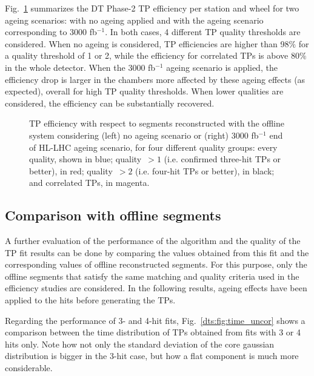 \documentclass[../main.tex]{subfiles}
\begin{document}
Fig.~\ref{dts:fig:efficiency} summarizes the DT Phase-2 TP efficiency per station and wheel for two ageing scenarios: with no ageing applied and with the ageing scenario corresponding to 3000 fb${}^{-1}$. In both cases, 4 different TP quality thresholds are considered. When no ageing is considered, TP efficiencies are higher than 98$\%$ for a quality threshold of 1 or 2, while the efficiency for correlated TPs is above 80$\%$ in the whole detector. When the 3000 fb${}^{-1}$ ageing scenario is applied, the efficiency drop is larger in the chambers more affected by these ageing effects (as expected), overall for high TP quality thresholds. When lower qualities are considered, the efficiency can be substantially recovered.


\begin{figure}[h!]

\begin{center}
\end{center}
\caption{TP efficiency with respect to segments reconstructed with the offline system considering (left) no ageing scenario or (right) 3000 fb${}^{-1}$ end of HL-LHC ageing scenario, for four different quality groups: every quality, shown in blue; quality~$>1$ (i.e. confirmed three-hit TPs or better), in red; quality~$>2$ (i.e. four-hit TPs or better), in black; and correlated TPs, in magenta.}
\label{dts:fig:efficiency}
\end{figure}


\subsection{Comparison with offline segments}

A further evaluation of the performance of the algorithm and the quality of the TP fit results can be done by comparing the values obtained from this fit and the corresponding values of offline reconstructed segments. For this purpose, only the offline segments that satisfy the same matching and quality criteria used in the efficiency studies are considered. In the following results, ageing effects have been applied to the hits before generating the TPs.

Regarding the performance of 3- and 4-hit fits, Fig.~\ref{dts:fig:time_uncor} shows a comparison between the time distribution of TPs obtained from fits with 3 or 4 hits only. Note how not only the standard deviation of the core gaussian distribution is bigger in the 3-hit case, but how a flat component is much more considerable.
\end{document}
